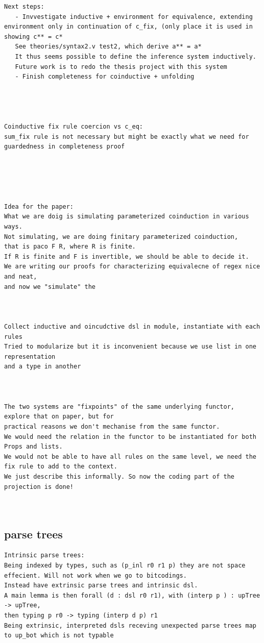 \begin{verbatim}
Next steps:
   - Invvestigate inductive + environment for equivalence, extending environment only in continuation of c_fix, (only place it is used in showing c** = c*
   See theories/syntax2.v test2, which derive a** = a*
   It thus seems possible to define the inference system inductively.
   Future work is to redo the thesis project with this system
   - Finish completeness for coinductive + unfolding




Coinductive fix rule coercion vs c_eq:
sum_fix rule is not necessary but might be exactly what we need for guardedness in completeness proof





Idea for the paper:
What we are doig is simulating parameterized coinduction in various ways. 
Not simulating, we are doing finitary parameterized coinduction,
that is paco F R, where R is finite. 
If R is finite and F is invertible, we should be able to decide it.
We are writing our proofs for characterizing equivalecne of regex nice and neat,
and now we "simulate" the 



Collect inductive and oincudctive dsl in module, instantiate with each rules
Tried to modularize but it is inconvenient because we use list in one representation
and a type in another



The two systems are "fixpoints" of the same underlying functor, explore that on paper, but for 
practical reasons we don't mechanise from the same functor. 
We would need the relation in the functor to be instantiated for both Props and lists.
We would not be able to have all rules on the same level, we need the fix rule to add to the context.
We just describe this informally. So now the coding part of the projection is done!



\end{verbatim}

\subsection{parse trees}
\begin{verbatim}
Intrinsic parse trees:
Being indexed by types, such as (p_inl r0 r1 p) they are not space effecient. Will not work when we go to bitcodings.
Instead have extrinsic parse trees and intrinsic dsl.
A main lemma is then forall (d : dsl r0 r1), with (interp p ) : upTree -> upTree, 
then typing p r0 -> typing (interp d p) r1  
Being extrinsic, interpreted dsls receving unexpected parse trees map to up_bot which is not typable

\end{verbatim}

